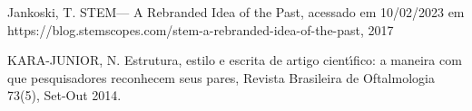 \documentclass[
12pt,		%
openright,	%
twoside,  %
a4paper,			%
chapter=TITLE,		%
english,			%
french,				%
spanish,			%
brazil				%
]{USPSC-classe/USPSC}
\begin{document}
\begin{flushleft}
\begin{flushleft}
\begin{flushleft}
\begin{flushleft}
\begin{flushleft}
\begin{flushleft}
\begin{flushleft}
\begin{flushleft}
\begin{flushleft}
[JANKOSKI, 2017] Jankoski, T. STEM— A Rebranded Idea of the Past, acessado em 10/02/2023 em https://blog.stemscopes.com/stem-a-rebranded-idea-of-the-past, 2017
\end{flushleft}


\end{flushleft}


\end{flushleft}


\end{flushleft}


\end{flushleft}


\end{flushleft}


\end{flushleft}


\end{flushleft}


\end{flushleft}


\begin{flushleft}
\begin{flushleft}
\begin{flushleft}
\begin{flushleft}
\begin{flushleft}
\begin{flushleft}
\begin{flushleft}
\begin{flushleft}
\begin{flushleft}
 KARA-JUNIOR, N. Estrutura, estilo e escrita de artigo cient\'{\i}fico: a maneira com que pesquisadores reconhecem seus pares, Revista Brasileira de Oftalmologia 73(5), Set-Out 2014.
\end{flushleft}


\end{flushleft}


\end{flushleft}


\end{flushleft}


\end{flushleft}


\end{flushleft}


\end{flushleft}


\end{flushleft}


\end{flushleft}
\end{document}
